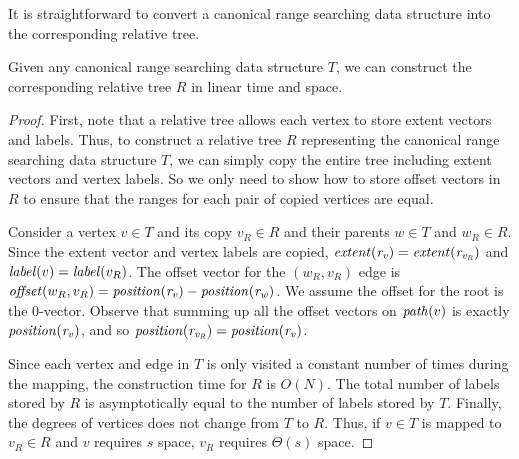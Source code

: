 It is straightforward to convert a canonical range searching data structure into the corresponding relative tree.
\begin{lemma}\label{lem:abs2rel}
Given any canonical range searching data structure $T$, we can construct the corresponding relative tree $R$ in linear time and space. 
\end{lemma}
\begin{proof}
First, note that a relative tree allows each vertex to store extent vectors and labels. Thus, to construct a relative tree $R$ representing the canonical range searching data structure $T$, we can simply copy the entire tree including extent vectors and vertex labels. So we only need to show how to store offset vectors in $R$ to ensure that the ranges for each pair of copied vertices are equal.

Consider a vertex $v \in T$ and its copy $v_R \in R$ and their parents $w \in T$ and $w_R \in R$. Since the extent vector and vertex labels are copied, $\mathit{extent}(\mathit{r_{v}}) = \mathit{extent}(\mathit{r_{v_R}})$ and $\mathit{label}(v) = \mathit{label}(v_R)$. The offset vector for the $(w_R, v_R)$ edge is $\mathit{offset}(w_R, v_R) = \mathit{position}(\mathit{r_{v}}) - \mathit{position}(\mathit{r_{w}})$. We assume the offset for the root is the 0-vector. Observe that summing up all the offset vectors on $\mathit{path}(v)$ is exactly $\mathit{position}(\mathit{r_{v}})$, and so $\mathit{position}(\mathit{r_{v_R}}) = \mathit{position}(\mathit{r_{v}})$.

Since each vertex and edge in $T$ is only visited a constant number of times during the mapping, the construction time for $R$ is $O(N)$. The total number of labels stored by $R$ is asymptotically equal to the number of labels stored by $T$. Finally, the degrees of vertices does not change from $T$ to $R$. Thus, if $v \in T$ is mapped to $v_R \in R$ and $v$ requires $s$ space, $v_R$ requires $\Theta(s)$ space.
\end{proof}

